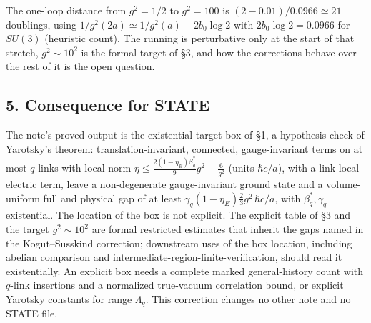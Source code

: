 \documentclass[11pt,a4paper]{article}
\begin{document}
The one-loop distance from \(g^2=1/2\) to \(g^2=100\) is
\((2-0.01)/0.0966\simeq21\) doublings, using
\(1/g^2(2a)\simeq1/g^2(a)-2b_0\log2\) with \(2b_0\log2=0.0966\) for
\(SU(3)\) (heuristic count). The running is perturbative only at the
start of that stretch, \(g^2\sim10^2\) is the formal target of §3, and
how the corrections behave over the rest of it is the open question.

\hypertarget{consequence-for-state}{%
\subsection{5. Consequence for STATE}\label{consequence-for-state}}

The note's proved output is the existential target box of §1, a
hypothesis check of Yarotsky's theorem: translation-invariant,
connected, gauge-invariant terms on at most \(q\) links with local norm
\(\eta\le\frac{2(1-\eta_E)\beta^*_q}9g^2-\frac6{g^2}\) (units
\(\hbar c/a\)), with a link-local electric term, leave a non-degenerate
gauge-invariant ground state and a volume-uniform full and physical gap
of at least \(\gamma_q(1-\eta_E)\frac23g^2\,\hbar c/a\), with
\(\beta^*_q,\gamma_q\) existential. The location of the box is not
explicit. The explicit table of §3 and the target \(g^2\sim10^2\) are
formal restricted estimates that inherit the gaps named in the
Kogut--Susskind correction; downstream uses of the box location,
including \href{strong-coupling-uniform-gap.md}{abelian comparison} and
\href{intermediate-region-finite-verification.md}{intermediate-region-finite-verification},
should read it existentially. An explicit box needs a complete marked
general-history count with \(q\)-link insertions and a normalized
true-vacuum correlation bound, or explicit Yarotsky constants for range
\(\Lambda_q\). This correction changes no other note and no STATE file.
\end{document}
